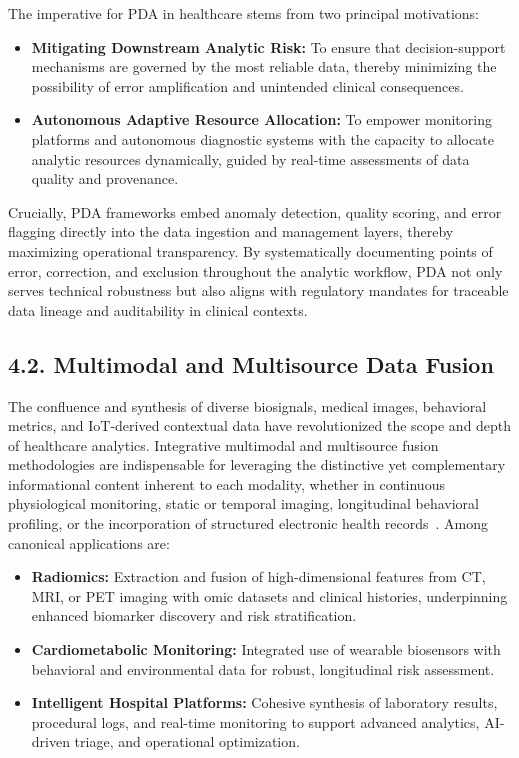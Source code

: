 \documentclass[11pt]{article}
\begin{document}
The imperative for PDA in healthcare stems from two principal motivations:
\begin{itemize}
    \item \textbf{Mitigating Downstream Analytic Risk:} To ensure that decision-support mechanisms are governed by the most reliable data, thereby minimizing the possibility of error amplification and unintended clinical consequences.
    \item \textbf{Autonomous Adaptive Resource Allocation:} To empower monitoring platforms and autonomous diagnostic systems with the capacity to allocate analytic resources dynamically, guided by real-time assessments of data quality and provenance.
\end{itemize}
Crucially, PDA frameworks embed anomaly detection, quality scoring, and error flagging directly into the data ingestion and management layers, thereby maximizing operational transparency. By systematically documenting points of error, correction, and exclusion throughout the analytic workflow, PDA not only serves technical robustness but also aligns with regulatory mandates for traceable data lineage and auditability in clinical contexts.

\subsection{4.2. Multimodal and Multisource Data Fusion}

The confluence and synthesis of diverse biosignals, medical images, behavioral metrics, and IoT-derived contextual data have revolutionized the scope and depth of healthcare analytics. Integrative multimodal and multisource fusion methodologies are indispensable for leveraging the distinctive yet complementary informational content inherent to each modality, whether in continuous physiological monitoring, static or temporal imaging, longitudinal behavioral profiling, or the incorporation of structured electronic health records~\cite{ref41, ref42, ref46, ref50, ref53, ref54, ref60, ref61, ref62, ref64, ref65, ref70, ref71, ref84, ref86, ref89, ref90, ref106, ref107}. Among canonical applications are:
\begin{itemize}
    \item \textbf{Radiomics:} Extraction and fusion of high-dimensional features from CT, MRI, or PET imaging with omic datasets and clinical histories, underpinning enhanced biomarker discovery and risk stratification.
    \item \textbf{Cardiometabolic Monitoring:} Integrated use of wearable biosensors with behavioral and environmental data for robust, longitudinal risk assessment.
    \item \textbf{Intelligent Hospital Platforms:} Cohesive synthesis of laboratory results, procedural logs, and real-time monitoring to support advanced analytics, AI-driven triage, and operational optimization.
\end{itemize}
\end{document}
